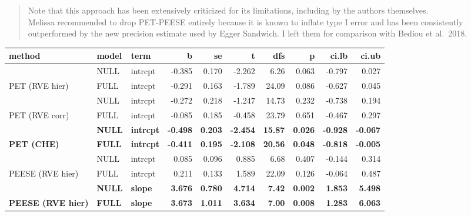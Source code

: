 \documentclass[
]{book}
\begin{document}
\begin{quote}
Note that this approach has been extensively criticized for its limitations,
including by the authors themselves.\\
Melissa recommended to drop PET-PEESE entirely because it is known to inflate
type I error and has been consistently outperformed by the new precision estimate
used by Egger Sandwich.
I left them for comparison with Bediou et al.~2018.
\end{quote}

\begin{tabular}{l|l|l|r|r|r|r|r|r|r}
\hline
method & model & term & b & se & t & dfs & p & ci.lb & ci.ub\\
\hline
 & NULL & intrcpt & -0.385 & 0.170 & -2.262 & 6.26 & 0.063 & -0.797 & 0.027\\
\cline{2-10}
\multirow[t]{-2}{*}{\raggedright\arraybackslash PET (RVE hier)} & FULL & intrcpt & -0.291 & 0.163 & -1.789 & 24.09 & 0.086 & -0.627 & 0.045\\
\cline{1-10}
 & NULL & intrcpt & -0.272 & 0.218 & -1.247 & 14.73 & 0.232 & -0.738 & 0.194\\
\cline{2-10}
\multirow[t]{-2}{*}{\raggedright\arraybackslash PET (RVE corr)} & FULL & intrcpt & -0.085 & 0.185 & -0.458 & 23.79 & 0.651 & -0.467 & 0.297\\
\cline{1-10}
 & \textbf{NULL} & \textbf{intrcpt} & \textbf{-0.498} & \textbf{0.203} & \textbf{-2.454} & \textbf{15.87} & \textbf{0.026} & \textbf{-0.928} & \textbf{-0.067}\\
\cline{2-10}
\multirow[t]{-2}{*}{\raggedright\arraybackslash \textbf{PET (CHE)}} & \textbf{FULL} & \textbf{intrcpt} & \textbf{-0.411} & \textbf{0.195} & \textbf{-2.108} & \textbf{20.56} & \textbf{0.048} & \textbf{-0.818} & \textbf{-0.005}\\
\cline{1-10}
 & NULL & intrcpt & 0.085 & 0.096 & 0.885 & 6.68 & 0.407 & -0.144 & 0.314\\
\cline{2-10}
\multirow[t]{-2}{*}{\raggedright\arraybackslash PEESE (RVE hier)} & FULL & intrcpt & 0.211 & 0.133 & 1.589 & 22.09 & 0.126 & -0.064 & 0.487\\
\cline{1-10}
 & \textbf{NULL} & \textbf{slope} & \textbf{3.676} & \textbf{0.780} & \textbf{4.714} & \textbf{7.42} & \textbf{0.002} & \textbf{1.853} & \textbf{5.498}\\
\cline{2-10}
\multirow[t]{-2}{*}{\raggedright\arraybackslash \textbf{PEESE (RVE hier)}} & \textbf{FULL} & \textbf{slope} & \textbf{3.673} & \textbf{1.011} & \textbf{3.634} & \textbf{7.00} & \textbf{0.008} & \textbf{1.283} & \textbf{6.063}\\

\end{tabular}
\end{document}
